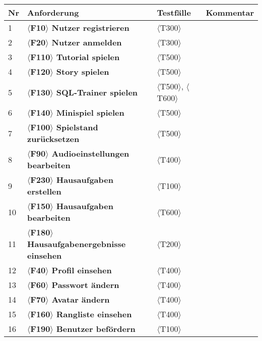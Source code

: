 \begin{center}
	\begin{longtable}{|m{}|m{}|m{}|m{}|}
		\hline
		\textbf{Nr} & \textbf{Anforderung} & \textbf{Testfälle} & \textbf{Kommentar}\\ 
		\hline
		1  & \textbf{$\langle$F10$\rangle$ Nutzer registrieren }  &  $\langle$T300$\rangle$   &     \\ 
		\hline
      		2  & \textbf{$\langle$F20$\rangle$ Nutzer anmelden } &  $\langle$T300$\rangle$   &    \\ 
		\hline
		3  & \textbf{$\langle$F110$\rangle$ Tutorial spielen } &  $\langle$T500$\rangle$   &     \\ 
		\hline
		4  & \textbf{$\langle$F120$\rangle$ Story spielen } &  $\langle$T500$\rangle$   &     \\ 
		\hline
		5  & \textbf{$\langle$F130$\rangle$ SQL-Trainer spielen } &  $\langle$T500$\rangle$, $\langle$T600$\rangle$   &    \\ 
		\hline
		6  & \textbf{$\langle$F140$\rangle$ Minispiel spielen } &  $\langle$T500$\rangle$   &    \\ 
		\hline
		7  & \textbf{$\langle$F100$\rangle$ Spielstand zurücksetzen } &  $\langle$T500$\rangle$   &     \\ 
		\hline
		8  & \textbf{$\langle$F90$\rangle$ Audioeinstellungen bearbeiten } &  $\langle$T400$\rangle$   &     \\ 
		\hline
		9  & \textbf{$\langle$F230$\rangle$ Hausaufgaben erstellen } &  $\langle$T100$\rangle$   &  \\ 
		\hline
		10  & \textbf{$\langle$F150$\rangle$ Hausaufgaben bearbeiten } &  $\langle$T600$\rangle$   &     \\ 
		\hline
		11  & \textbf{$\langle$F180$\rangle$ Hausaufgabenergebnisse einsehen } &  $\langle$T200$\rangle$   &     \\ 
		\hline
		12 & \textbf{$\langle$F40$\rangle$ Profil einsehen } &  $\langle$T400$\rangle$   &     \\ 
		\hline
		13 & \textbf{$\langle$F60$\rangle$ Passwort ändern } &  $\langle$T400$\rangle$   &   \\ 
		\hline
		14  & \textbf{$\langle$F70$\rangle$ Avatar ändern } &  $\langle$T400$\rangle$   &    \\ 
		\hline
		15  & \textbf{$\langle$F160$\rangle$ Rangliste einsehen } &  $\langle$T400$\rangle$   &     \\ 
		\hline
		16  & \textbf{$\langle$F190$\rangle$ Benutzer befördern } &  $\langle$T100$\rangle$   &     \\ 

\end{longtable}
\end{center}
